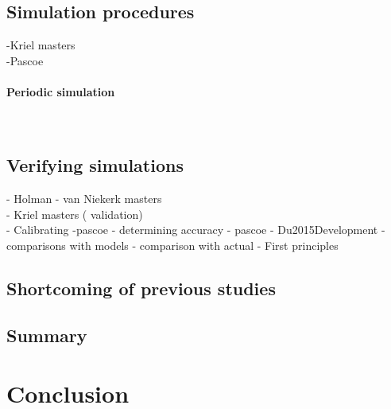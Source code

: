 	\subsection{Simulation procedures}
		-Kriel masters\\
		-Pascoe\\
		\paragraph{Periodic simulation}\leavevmode\\
 	\subsection{Verifying simulations}
 		- Holman
 		- van Niekerk masters\\
 		- Kriel masters ( validation)\\
 		- Calibrating -pascoe
 		- determining accuracy - pascoe
 		- Du2015Development
 		- comparisons with models
 		- comparison with actual 
 		- First principles
 	\subsection{Shortcoming of previous studies}
	\subsection{Summary}
\section{Conclusion}